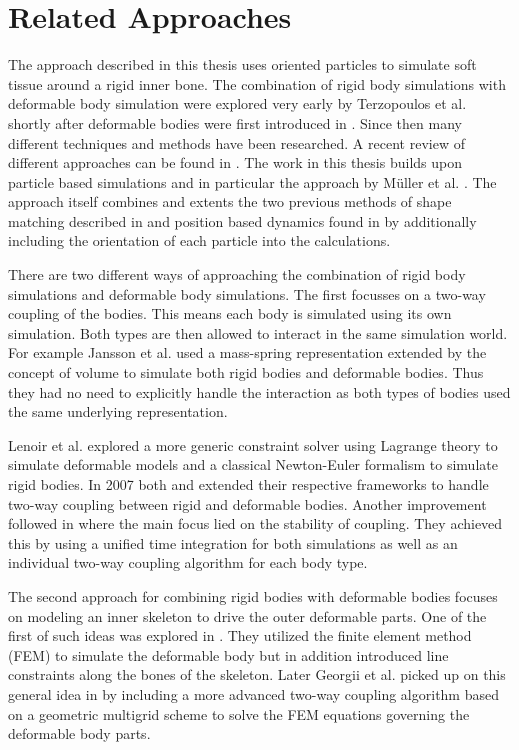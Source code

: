 \chapter{Related Approaches}
\label{cha:related_approaches}

The approach described in this thesis uses oriented particles to simulate soft tissue around a rigid inner bone. The combination of rigid body simulations with deformable body simulation were explored very early by Terzopoulos et al. \cite{Terzopoulos:1988bz} shortly after deformable bodies were first introduced in \cite{Terzopoulos:1987gf}. Since then many different techniques and methods have been researched. A recent review of different approaches can be found in \cite{Nealen:2006vp}. The work in this thesis builds upon particle based simulations and in particular the approach by M{\"u}ller et al. \cite{Muller:2011gn}. The approach itself combines and extents the two previous methods of shape matching described in \cite{Muller:2005fi} and position based dynamics found in \cite{Muller:2007vs} by additionally including the orientation of each particle into the calculations.

There are two different ways of approaching the combination of rigid body simulations and deformable body simulations. The first focusses on a two-way coupling of the bodies. This means each body is simulated using its own simulation. Both types are then allowed to interact in the same simulation world. For example Jansson et al. \cite{Jansson:2003cb} used a mass-spring representation extended by the concept of volume to simulate both rigid bodies and deformable bodies. Thus they had no need to explicitly handle the interaction as both types of bodies used the same underlying representation.

Lenoir et al. \cite{Lenoir:2004ic} explored a more generic constraint solver using Lagrange theory to simulate deformable models and a classical Newton-Euler formalism to simulate rigid bodies. In 2007 both \cite{Muller:2007vs} and \cite{Sifakis:2007to} extended their respective frameworks to handle two-way coupling between rigid and deformable bodies. Another improvement followed in \cite{Shinar:2008va} where the main focus lied on the stability of coupling. They achieved this by using a unified time integration for both simulations as well as an individual two-way coupling algorithm for each body type.

The second approach for combining rigid bodies with deformable bodies focuses on modeling an inner skeleton to drive the outer deformable parts. One of the first of such ideas was explored in \cite{Capell:2002ge}. They utilized the finite element method (FEM) to simulate the deformable body but in addition introduced line constraints along the bones of the skeleton. Later Georgii et al. picked up on this general idea in \cite{Georgii:2010tw} by including a more advanced two-way coupling algorithm based on a geometric multigrid scheme to solve the FEM equations governing the deformable body parts.

